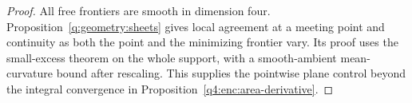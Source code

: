 \begin{proof}
All free frontiers are smooth in dimension four.
Proposition~\ref{q:geometry:sheets} gives local agreement at a meeting
point and continuity as both the point and the minimizing frontier
vary. Its proof uses the small-excess theorem on the whole support,
with a smooth-ambient mean-curvature bound after rescaling. This
supplies the pointwise plane control beyond the integral convergence
in Proposition~\ref{q4:enc:area-derivative}.
\end{proof}
